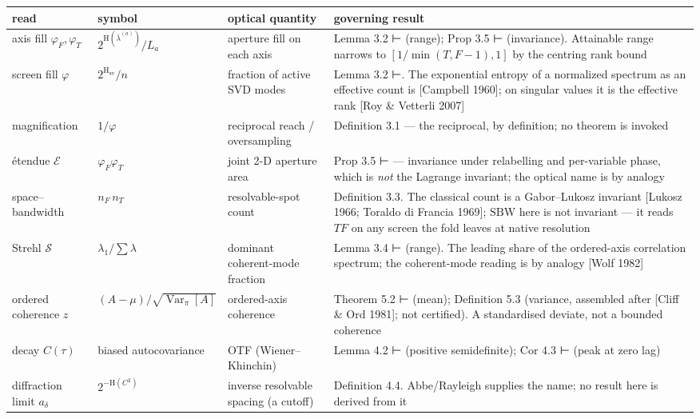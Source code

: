 \documentclass[10pt,letterpaper,twocolumn]{article}
\begin{document}
\begin{table}[tp]
\centering\footnotesize
\begin{tabular}{L{0.208\textwidth}L{0.166\textwidth}L{0.167\textwidth}L{0.392\textwidth}}
\toprule
read & symbol & optical quantity & governing result \\
\midrule
axis fill \(\varphi_F,\varphi_T\) & \(2^{\mathrm{H}(\bar\lambda^{(a)})}/L_a\) & aperture fill on each axis & Lemma 3.2 ⊢ (range); Prop 3.5 ⊢ (invariance). Attainable range narrows
to \([1/\min(T,F-1),1]\) by the centring rank bound \\
screen fill \(\varphi\) & \(2^{\mathrm H_{\mathrm{sv}}}/n\) & fraction of active SVD modes & Lemma 3.2 ⊢. The exponential entropy of a normalized spectrum as an
effective count is {[}Campbell 1960{]}; on singular values it is the
effective rank {[}Roy \& Vetterli 2007{]} \\
magnification & \(1/\varphi\) & reciprocal reach / oversampling & Definition 3.1 --- the reciprocal, by definition; no theorem is invoked \\
étendue \(\mathcal E\) & \(\varphi_F\varphi_T\) & joint 2-D aperture area & Prop 3.5 ⊢ --- invariance under relabelling and per-variable phase,
which is \emph{not} the Lagrange invariant; the optical name is by
analogy \\
space--bandwidth & \(n_F\,n_T\) & resolvable-spot count & Definition 3.3. The classical count is a Gabor--Lukosz invariant
{[}Lukosz 1966; Toraldo di Francia 1969{]}; \(\mathrm{SBW}\) here is not
invariant --- it reads \(TF\) on any screen the fold leaves at native
resolution \\
Strehl \(\mathcal S\) & \(\lambda_1/\!\sum\lambda\) & dominant coherent-mode fraction & Lemma 3.4 ⊢ (range). The leading share of the ordered-axis correlation
spectrum; the coherent-mode reading is by analogy {[}Wolf 1982{]} \\
ordered coherence \(z\) & \((A-\mu)/\sqrt{\operatorname{Var}_\pi[A]}\) & ordered-axis coherence & Theorem 5.2 ⊢ (mean); Definition 5.3 (variance, assembled after {[}Cliff
\& Ord 1981{]}; not certified). A standardised deviate, not a bounded
coherence \\
decay \(C(\tau)\) & biased autocovariance & OTF (Wiener--Khinchin) & Lemma 4.2 ⊢ (positive semidefinite); Cor 4.3 ⊢ (peak at zero lag) \\
diffraction limit \(a_\delta\) & \(2^{-\mathrm H(C^2)}\) & inverse resolvable spacing (a cutoff) & Definition 4.4. Abbe/Rayleigh supplies the name; no result here is
derived from it \\

\end{tabular}
\end{table}
\end{document}
